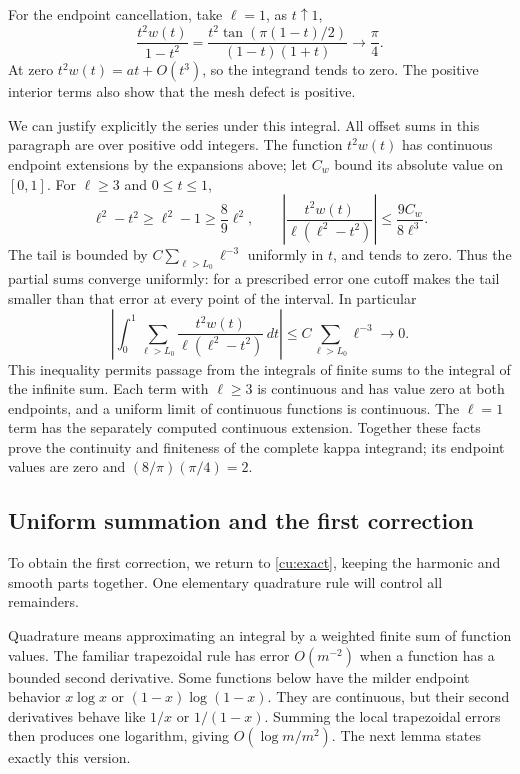 For the endpoint cancellation, take $\ell=1$, as $t\uparrow1$,
\[
 \frac{t^2w(t)}{1-t^2}
   =\frac{t^2\tan(\pi(1-t)/2)}{(1-t)(1+t)}
       \longrightarrow\frac\pi4.
\]
At zero $t^2w(t)=at+O(t^3)$, so the integrand tends to zero.
The positive interior terms also show that the mesh defect is positive.

We can justify explicitly the series under this integral. All offset
sums in this paragraph are over positive odd integers.
The function $t^2w(t)$ has continuous endpoint extensions by the
expansions above; let $C_w$ bound its absolute value on $[0,1]$.
For $\ell\geq3$ and $0\leq t\leq1$,
\[
 \ell^2-t^2\geq\ell^2-1\geq\frac89\ell^2,\qquad
 \left|\frac{t^2w(t)}{\ell(\ell^2-t^2)}\right|
                  \leq\frac{9C_w}{8\ell^3}.
\]
The tail is bounded by $C\sum_{\ell>L_0}\ell^{-3}$ uniformly
in $t$, and tends to zero. Thus the partial sums converge uniformly:
for a prescribed error one cutoff makes the tail smaller than that
error at every point of the interval. In particular
\[
 \left|\int_0^1\sum_{\ell>L_0}
           \frac{t^2w(t)}{\ell(\ell^2-t^2)}\,dt\right|
       \leq C\sum_{\ell>L_0}\ell^{-3}\longrightarrow0.
\]
This inequality permits passage from the integrals of finite sums
to the integral of the infinite sum. Each term with $\ell\geq3$
is continuous and has value zero at both endpoints, and a uniform
limit of continuous functions is continuous. The $\ell=1$ term
has the separately computed continuous extension. Together these
facts prove the continuity and finiteness of the complete kappa
integrand; its endpoint values are zero and $(8/\pi)(\pi/4)=2$.

\subsection{Uniform summation and the first correction}\label{sec:asym}
To obtain the first correction, we return to \eqref{cu:exact}, keeping
the harmonic and smooth parts together.
One elementary quadrature rule will control all remainders.

Quadrature means approximating an integral by a weighted finite sum
of function values. The familiar trapezoidal rule has error
$O(m^{-2})$ when a function has a bounded second derivative.
Some functions below have the milder endpoint behavior $x\log x$
or $(1-x)\log(1-x)$. They are continuous, but their second
derivatives behave like $1/x$ or $1/(1-x)$. Summing the local
trapezoidal errors then produces one logarithm, giving
$O(\log m/m^2)$. The next lemma states exactly this version.

